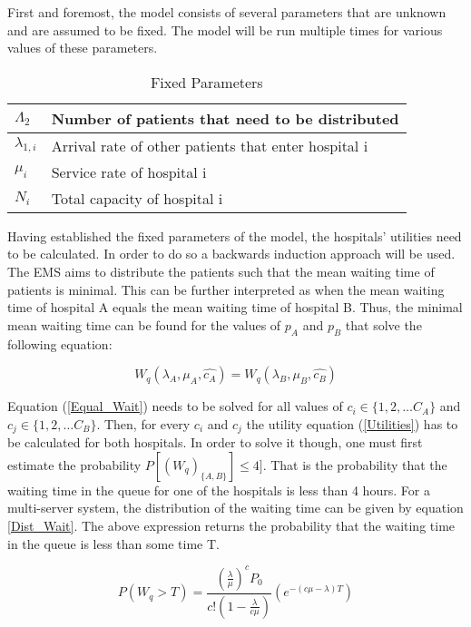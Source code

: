 First and foremost, the model consists of several parameters that are unknown and 
are assumed to be fixed. 
The model will be run multiple times for various values of these parameters.


\begin{table}[h]
    \centering
    \begin{tabular}{|l|l|}
        \hline
        \( \Lambda_2 \) & Number of patients that need to be distributed \\ \hline
        \( \lambda_{1,i} \) & Arrival rate of other patients that enter hospital i \\ \hline
        \( \mu_i \) & Service rate of hospital i \\ \hline
        \( N_i \) & Total capacity of hospital i \\ \hline
    \end{tabular}
    \caption{Fixed Parameters}
\end{table}

Having established the fixed parameters of the model, the hospitals' utilities need 
to be calculated. 
In order to do so a backwards induction approach will be used. 
The EMS aims to distribute the patients such that the mean waiting time of patients 
is minimal. 
This can be further interpreted as when the mean waiting time of hospital A equals 
the mean waiting time of hospital B. 
Thus, the minimal mean waiting time can be found for the values of \( p_A \) and 
\( p_B \) that solve the following equation:

\begin{equation}\label{Equal_Wait}
    W_q(\lambda_A, \mu_A, \hat{c_A}) = W_q(\lambda_B, \mu_B, \hat{c_B})
\end{equation}

Equation (\ref{Equal_Wait}) needs to be solved for all values of \( c_i \in \{1,2, 
\dots C_A\} \) and \( c_j \in \{1,2, \dots C_B\} \). 
Then, for every \( c_i \) and \( c_j \) the utility equation (\ref{Utilities}) has 
to be calculated for both hospitals. 
In order to solve it though, one must first estimate the probability 
\( P[(W_q)_{\{A, B\}}] \leq 4] \). 
That is the probability that the waiting time in the queue for one of the hospitals 
is less than 4 hours. 
For a multi-server system, the distribution of the waiting time can be given by 
equation \ref{Dist_Wait}. 
The above expression returns the probability that the waiting time in the queue 
is less than some time T.

\begin{equation}\label{Dist_Wait}
    P(W_q > T) = \frac{(\frac{\lambda}{\mu})^c P_0}{c!(1-\frac{\lambda}{c \mu})} 
    (e^{-(c \mu - \lambda)T})
\end{equation}

